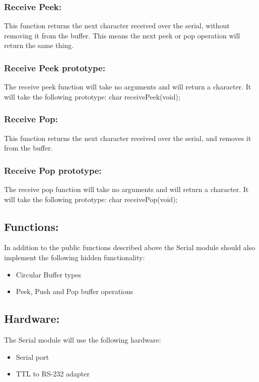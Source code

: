 \documentclass[]{article}
\begin{document}
\subsubsection{Receive Peek:}
This function returns the next character received over the serial, without removing it from the buffer. This means the next peek or pop operation will return the same thing.

\subsubsection{Receive Peek prototype:}
The receive peek function will take no arguments and will return a character. It will take the following prototype: \newline \newline
char receivePeek(void);

\subsubsection{Receive Pop:}
This function returns the next character received over the serial, and removes it from the buffer.

\subsubsection{Receive Pop prototype:}
The receive pop function will take no arguments and will return a character. It will take the following prototype: \newline \newline
char receivePop(void);

\subsection{Functions:}
In addition to the public functions described above the Serial module should also implement the following hidden functionality:
\begin{itemize}
	\item Circular Buffer types
	\item Peek, Push and Pop buffer operations
\end{itemize}

\subsection{Hardware:}
The Serial module will use the following hardware:
\begin{itemize}
	\item Serial port
	\item TTL to RS-232 adapter
\end{itemize}
\end{document}
